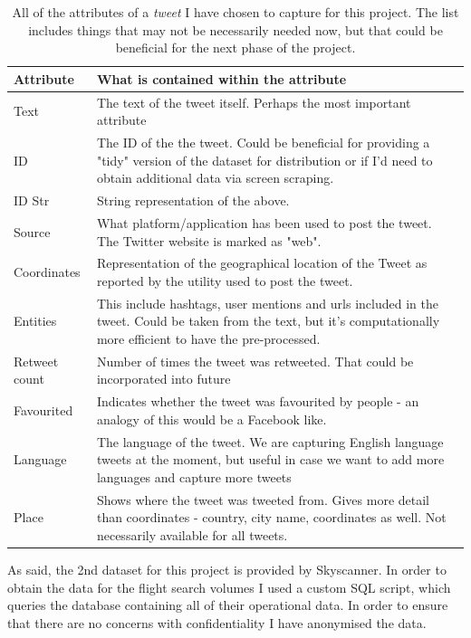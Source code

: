 \documentclass[minf,frontabs,twoside,singlespacing,parskip]{infthesis}
\begin{document}
\begin{table}[]
\begin{center}
\begin{tabular}{ l | p{11cm} }
\textbf{Attribute} & \textbf{What is contained within the attribute} \\
\hline
\hline
Text & The text of the tweet itself. Perhaps the most important attribute \\
\hline
ID & The ID of the the tweet. Could be beneficial for providing a "tidy" version of the dataset for distribution or if I'd need to obtain additional data via screen scraping. \\
\hline
ID Str & String representation of the above. \\
\hline
Source & What platform/application has been used to post the tweet. The Twitter website is marked as "web". \\
\hline
Coordinates  & Representation of the geographical location of the Tweet as reported by the utility used to post the tweet. \\
\hline
Entities & This include hashtags, user mentions and urls included in the tweet. Could be taken from the text, but it's computationally more efficient to have the pre-processed. \\
\hline
Retweet count & Number of times the tweet was retweeted. That could be incorporated into future \\
\hline
Favourited & Indicates whether the tweet was favourited by people - an analogy of this would be a Facebook like.  \\
\hline
Language & The language of the tweet. We are capturing English language tweets at the moment, but useful in case we want to add more languages and capture more tweets\\
\hline
Place &  Shows where the tweet was tweeted from. Gives more detail than coordinates - country, city name, coordinates as well. Not necessarily available for all tweets. \\
\end{tabular}
\end{center}
\caption{All of the attributes of a \emph{tweet} I have chosen to capture for this project. The list includes things that may not be necessarily needed now, but that could be beneficial for the next phase of the project. }
\end{table}


As said, the 2nd dataset for this project is provided by Skyscanner. In order to obtain the data for the flight search volumes I used a custom SQL script, which queries the database containing all of their operational data. In order to ensure that there are no concerns with confidentiality I have anonymised the data. 
\end{document}
